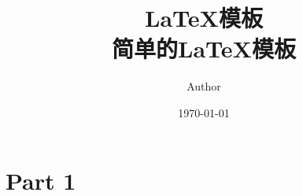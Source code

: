 \documentclass[UTF8, a4paper, 12pt]{ctexart}
\title{\textbf{\LaTeX 模板} \\ {\small 简单的\LaTeX 模板}}
\author{Author}
\date{\today}
\begin{document}
% 
\maketitle
\tableofcontents
\newpage

\section{Part 1}


% 
% 
\end{document}
